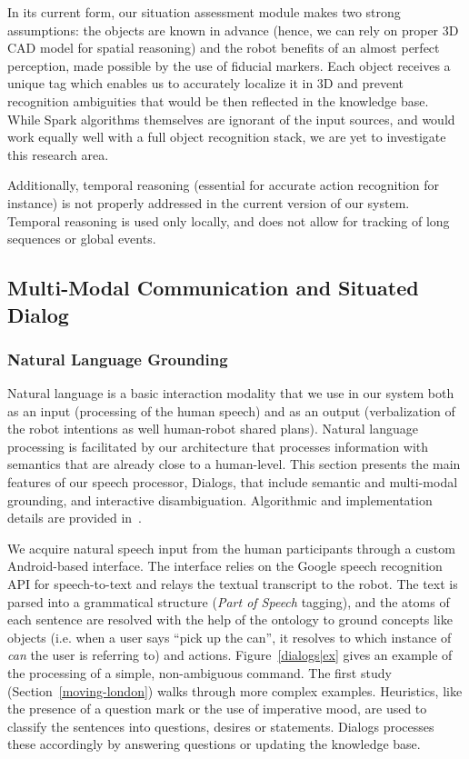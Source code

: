 \documentclass[preprint,3p,times]{elsarticle}
\newcommand{\ie}{i.e.\xspace}
\begin{document}
In its current form, our situation assessment module makes two strong
assumptions: the objects are known in advance (hence, we can rely on proper 3D
CAD model for spatial reasoning) and the robot benefits of an almost perfect
perception, made possible by the use of fiducial markers.  Each object receives
a unique tag which enables us to accurately localize it in 3D and prevent
recognition ambiguities that would be then reflected in the knowledge base.
While {\sc Spark} algorithms themselves are ignorant of the input sources, and
would work equally well with a full object recognition stack, we are yet to
investigate this research area.

Additionally, temporal reasoning (essential for accurate action recognition for
instance) is not properly addressed in the current version of our system. Temporal reasoning is used
only locally, and does not allow for tracking of long sequences or global events.


\subsection{Multi-Modal Communication and Situated Dialog}
\label{sect|com}

\subsubsection{Natural Language Grounding}

Natural language is a basic interaction modality that we use in our system both
as an input (processing of the human speech) and as an output (verbalization of the
robot intentions as well human-robot shared plans). Natural language processing is facilitated by our architecture
that processes information with semantics that are already close to a
human-level. This section presents the main features of our speech processor,
{\sc Dialogs}, that include semantic and multi-modal grounding, and interactive
disambiguation. Algorithmic and implementation details are provided
in~\cite{Lemaignan2011a}.

We acquire natural speech input from the human participants through a custom
Android-based interface. The interface relies on the Google speech recognition API for
speech-to-text and relays the textual transcript to the robot. The text is parsed into
a grammatical structure (\emph{Part of Speech} tagging), and the atoms of each
sentence are resolved with the help of the ontology to ground concepts like
objects (\ie when a user says ``pick up the can'', it resolves to which instance of
\emph{can} the user is referring to) and actions.  Figure~\ref{dialogs|ex} gives
an example of the processing of a simple, non-ambiguous command. The first
study (Section~\ref{moving-london}) walks through more complex examples.
Heuristics, like the presence of a question mark or the use of imperative mood,
are used to classify the sentences into questions, desires or statements.
{\sc Dialogs} processes these accordingly by answering questions or
updating the knowledge base.
\end{document}

